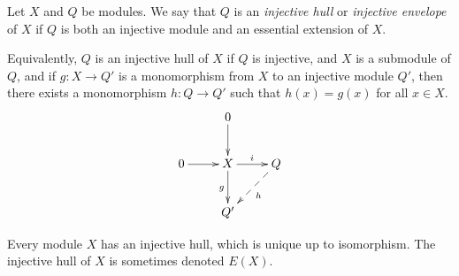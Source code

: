 \documentclass{article}
\begin{document}
Let $X$ and $Q$ be modules.
We say that $Q$ is an {\it injective hull} or {\it injective envelope} of $X$
if $Q$ is both an injective module and an essential extension of $X$.

Equivalently, $Q$ is an injective hull of $X$
if $Q$ is injective,
and $X$ is a submodule of $Q$,
and if $g : X \to Q'$ is a monomorphism
from $X$ to an injective module $Q'$,
then there exists a monomorphism $h : Q \to Q'$
such that $h(x) = g(x)$ for all $x \in X$.
$$
\xymatrix{
  &
  0
        \ar[d]
  \\
  0
        \ar[r]
  &
  X
        \ar[r]^i
        \ar[d]_g
  &
  Q
        \ar@{-->}[dl]^h
  \\
  &
  Q'
}
$$

Every module $X$ has an injective hull, which is unique up to isomorphism.  The injective hull of $X$ is sometimes denoted $E(X)$.
\end{document}
